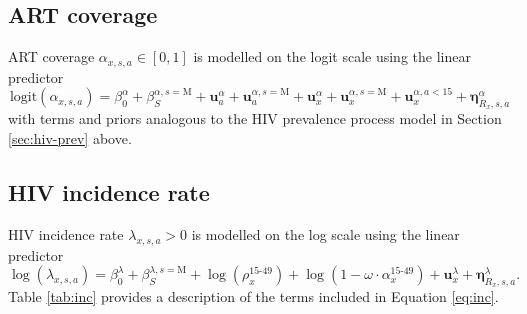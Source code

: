 \documentclass[a4paper, nobind]{templates/ociamthesis}
\newcommand{\bu}{\mathbf{u}}
\newcommand{\bmeta}{\bm{\eta}}
\begin{document}
\hypertarget{art-cov}{%
\subsection{ART coverage}\label{art-cov}}

ART coverage \(\alpha_{x, s, a} \in [0, 1]\) is modelled on the logit scale using the linear predictor
\begin{equation}
\text{logit}(\alpha_{x, s, a}) = \beta^\alpha_0 + \beta_{S}^{\alpha, s = \text{M}} + \bu^\alpha_a + \bu_a^{\alpha, s = \text{M}} + \bu^\alpha_x + \bu_x^{\alpha, s = \text{M}} + \bu_x^{\alpha, a < 15} + \bmeta^\alpha_{R_x, s, a} 
\end{equation}
with terms and priors analogous to the HIV prevalence process model in Section \ref{sec:hiv-prev} above.

\hypertarget{hiv-inc}{%
\subsection{HIV incidence rate}\label{hiv-inc}}

HIV incidence rate \(\lambda_{x, s, a} > 0\) is modelled on the log scale using the linear predictor
\begin{equation}
\log(\lambda_{x, s, a}) = \beta_0^\lambda + \beta_S^{\lambda, s = \text{M}} + \log(\rho_{x}^{\text{15-49}}) + \log(1 - \omega \cdot \alpha_{x}^{\text{15-49}}) + \bu_x^\lambda + \bmeta_{R_x, s, a}^\lambda. \label{eq:inc}
\end{equation}
Table \ref{tab:inc} provides a description of the terms included in Equation \ref{eq:inc}.
\end{document}
